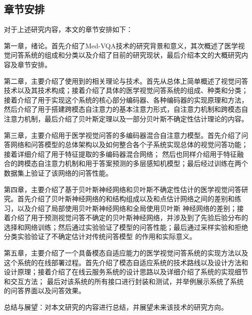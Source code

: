 \subsection{章节安排}
对于上述研究内容，本文的章节安排如下：

第一章，绪论。首先介绍了Med-VQA技术的研究背景和意义，其次概述了医学视觉问答系统的组成和分类以及介绍了目前的研究现状，最后介绍本文的大概研究内容及章节安排。

第二章，主要介绍了使用到的相关理论与技术。首先从总体上简单概述了视觉问答技术以及其技术构成；接着介绍了具体的医学视觉问答系统的组成、种类和分类；
接着介绍了用于实现这个系统的核心部分编码器、各种编码器的实现原理和方法，然后介绍了用于搭建跨模态自注意力的基本注意力形式，自注意力机制和跨模态自注意力机制，最后介绍了贝叶斯定理以及一部分贝叶斯不确定性估计理论的内容。

第三章，主要介绍用于医学视觉问答的多编码器混合自注意力模型。首先介绍了问答网络和问答模型的总体架构以及如何整合各个子系统实现总体的视觉问答功能；接着详细介绍了用于特征提取的多编码器混合网络；
然后也同样介绍用于特征融合的跨模态自注意力机制和用于答案预测的多层感知机模型；最后经过训练在两个数据集上验证了该网络的问答性能。

第四章，主要介绍了基于贝叶斯神经网络和贝叶斯不确定性估计的医学视觉问答研究。首先介绍了贝叶斯神经网络的和结构组成以及和点估计网络之间的差别和练习，以及介绍了局部使用贝叶斯神经网络和全局使用贝叶斯
神经网络的差别；接着介绍了用于预测视觉问答不确定的贝叶斯神经网络，并涉及到了先验后验分布的选择和网络训练；然后通过实验验证了模型的问答性能；最后通过采样实验和拒绝分类实验验证了不确定估计对传统问答模型
的作用和实际意义。

第五章，主要介绍了一个具备模态自适应能力的医学视觉问答系统的实现方法以及这个系统的在线部署过程。首先介绍了模态自适应系统的技术路线以及设计方法和设计原理；接着介绍了在线云服务系统的设计思路以及详细介绍了系统的实现细节和交互方法；
最后对该系统的所有接口进行封装和测试，并举例展示系统了系统的问答界面以及问答效果。

总结与展望：对本文研究的内容进行总结，并展望未来该技术的研究方向。


\newpage
\vspace*{\fill}